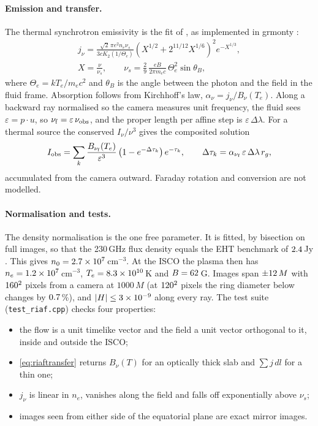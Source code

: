 \paragraph{Emission and transfer.} The thermal synchrotron emissivity is
the fit of \citet{LeungGammieNoble2011}, as implemented in grmonty
\citep{Dolence2009}:
\begin{equation}
\begin{gathered}
j_\nu = \frac{\sqrt2\,\pi e^2 n_e \nu_s}{3cK_2(1/\Theta_e)}
\left(X^{1/2} + 2^{11/12}X^{1/6}\right)^2 e^{-X^{1/3}}, \\
X = \frac{\nu}{\nu_s}, \qquad
\nu_s = \frac29\,\frac{eB}{2\pi m_e c}\,\Theta_e^2\sin\theta_B ,
\end{gathered}
\end{equation}
where $\Theta_e = kT_e/m_ec^2$ and $\theta_B$ is the angle between the photon
and the field in the fluid frame. Absorption follows from Kirchhoff's law,
$\alpha_\nu = j_\nu/B_\nu(T_e)$. Along a backward ray normalised so the camera
measures unit frequency, the fluid sees $\varepsilon = p\cdot u$, so
$\nu_{\rm f} = \varepsilon\,\nu_{\rm obs}$, and the proper length per affine
step is $\varepsilon\,\Delta\lambda$. For a thermal source the conserved
$I_\nu/\nu^3$ gives the composited solution
\begin{equation}
I_{\rm obs} = \sum_k \frac{B_{\nu_{\rm f}}(T_e)}{\varepsilon^3}
\left(1 - e^{-\Delta\tau_k}\right)e^{-\tau_k},
\qquad \Delta\tau_k = \alpha_{\nu_{\rm f}}\,\varepsilon\,\Delta\lambda\,r_g ,
\label{eq:riaftransfer}
\end{equation}
accumulated from the camera outward. Faraday rotation and conversion are
not modelled.

\paragraph{Normalisation and tests.} The density normalisation is the one
free parameter. It is fitted, by bisection on full images, so that the
230\,GHz flux density equals the EHT benchmark of $2.4$\,Jy
\citep{EHT2022}. This gives $n_0 = 2.7\times10^{7}$\,cm$^{-3}$. At the ISCO
the plasma then has $n_e = 1.2\times10^{7}$\,cm$^{-3}$, $T_e = 8.3\times10^{10}$\,K
and $B = 62$\,G. Images span $\pm12\,M$ with
$160^2$ pixels from a camera at $1000\,M$ (at $120^2$ pixels
the ring diameter below changes by $0.7$\,\%), and $|H| \le
3\times10^{-9}$ along every ray. The test suite (\texttt{test\_riaf.cpp}) checks
four properties:
\begin{itemize}
\item the flow is a unit timelike vector and the field a unit vector
orthogonal to it, inside and outside the ISCO;
\item \eqref{eq:riaftransfer} returns $B_\nu(T)$ for an optically thick
slab and $\sum j\,dl$ for a thin one;
\item $j_\nu$ is linear in $n_e$, vanishes along the field and falls off
exponentially above $\nu_s$;
\item images seen from either side of the equatorial plane are exact
mirror images.
\end{itemize}


